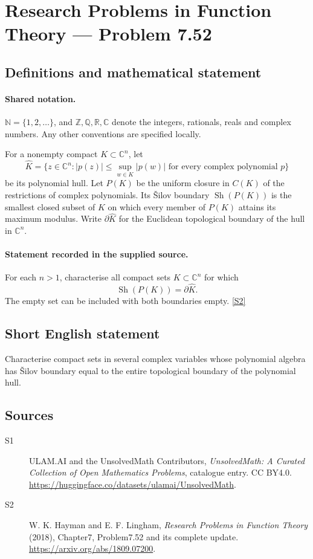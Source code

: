 \documentclass[11pt]{article}
\newcommand{\sref}[2]{\hyperlink{source:#1:#2}{[S#2]}}
\begin{document}
\section{Research Problems in Function Theory — Problem 7.52}\label{statement}

\subsection{Definitions and mathematical statement}

\paragraph{Shared notation.}$\mathbb N=\{1,2,\ldots\}$, and $\mathbb Z,\mathbb Q,\mathbb R,\mathbb C$ denote the integers, rationals, reals and complex numbers. Any other conventions are specified locally.


For a nonempty compact $K\subset\mathbb C^n$, let
\[\widehat K=\{z\in\mathbb C^n:|p(z)|\le\sup_{w\in K}|p(w)|\text{ for every complex polynomial }p\}\]
be its polynomial hull. Let $P(K)$ be the uniform closure in $C(K)$ of the restrictions of complex polynomials. Its Šilov boundary $\operatorname{Sh}(P(K))$ is the smallest closed subset of $K$ on which every member of $P(K)$ attains its maximum modulus. Write $\partial\widehat K$ for the Euclidean topological boundary of the hull in $\mathbb C^n$.

\paragraph{Statement recorded in the supplied source.}
For each $n>1$, characterise all compact sets $K\subset\mathbb C^n$ for which
\[\operatorname{Sh}(P(K))=\partial\widehat K.\]
The empty set can be included with both boundaries empty. \sref{statement}{2}

\subsection{Short English statement}
Characterise compact sets in several complex variables whose polynomial algebra has Šilov boundary equal to the entire topological boundary of the polynomial hull.
\subsection{Sources}
\begin{description}
\item[\hypertarget{source:statement:1}{S1}] ULAM.AI and the UnsolvedMath Contributors, \emph{UnsolvedMath: A Curated Collection of Open Mathematics Problems}, catalogue entry. CC BY4.0. \url{https://huggingface.co/datasets/ulamai/UnsolvedMath}.
\item[\hypertarget{source:statement:2}{S2}] W. K. Hayman and E. F. Lingham, \emph{Research Problems in Function Theory} (2018), Chapter7, Problem7.52 and its complete update. \url{https://arxiv.org/abs/1809.07200}.
\end{description}
\label{end:statement}
\end{document}
